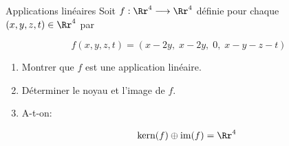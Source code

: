 \documentclass[exam]{cs188}
\begin{document}
\begin{problem}[4]{Applications linéaires}
    Soit $ f:\Rr^4\longrightarrow \Rr^4$ définie pour chaque $(x,y,z,t)\in
    \Rr^4$ par

    \begin{equation*}
        f(x,y,z,t) = \left(x-2y,\; x-2y,\;0,\; x-y-z-t\right)
    \end{equation*}

    \begin{enumerate}
        \item Montrer que $f$ est une application linéaire.
        \item Déterminer le noyau et l'image de $f$.
        \item A-t-on:

            \begin{equation*}
                \text{kern}(f) \oplus \text{im}(f) =\Rr^4
            \end{equation*}
    \end{enumerate}
\end{problem}
\end{document}
